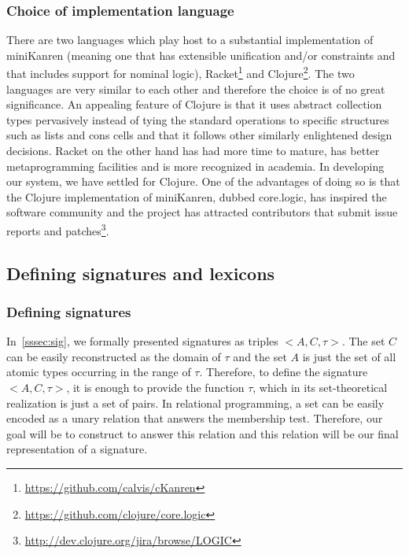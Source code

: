 \subsubsection{Choice of implementation language}

There are two languages which play host to a substantial implementation
of miniKanren (meaning one that has extensible unification and/or
constraints and that includes support for nominal logic),
Racket\footnote{\url{https://github.com/calvis/cKanren}} and
Clojure\footnote{\url{https://github.com/clojure/core.logic}}. The two
languages are very similar to each other and therefore the choice is of
no great significance. An appealing feature of Clojure is that it uses
abstract collection types pervasively instead of tying the standard
operations to specific structures such as lists and cons cells and that
it follows other similarly enlightened design decisions. Racket on the
other hand has had more time to mature, has better metaprogramming
facilities and is more recognized in academia. In developing our system,
we have settled for Clojure. One of the advantages of doing so is that
the Clojure implementation of miniKanren, dubbed core.logic, has
inspired the software community and the project has attracted
contributors that submit issue reports and
patches\footnote{\url{http://dev.clojure.org/jira/browse/LOGIC}}.


\subsection{Defining signatures and lexicons}

\subsubsection{Defining signatures}

In~\ref{sssec:sig}, we formally presented signatures as triples
$\mathopen{<}A, C, \tau\mathclose{>}$. The set $C$ can be easily
reconstructed as the domain of $\tau$ and the set $A$ is just the set of
all atomic types occurring in the range of $\tau$. Therefore, to define
the signature $\mathopen{<}A, C, \tau\mathclose{>}$, it is enough to
provide the function $\tau$, which in its set-theoretical realization is
just a set of pairs.  In relational programming, a set can be easily
encoded as a unary relation that answers the membership test. Therefore,
our goal will be to construct to answer this relation and this relation
will be our final representation of a signature.

